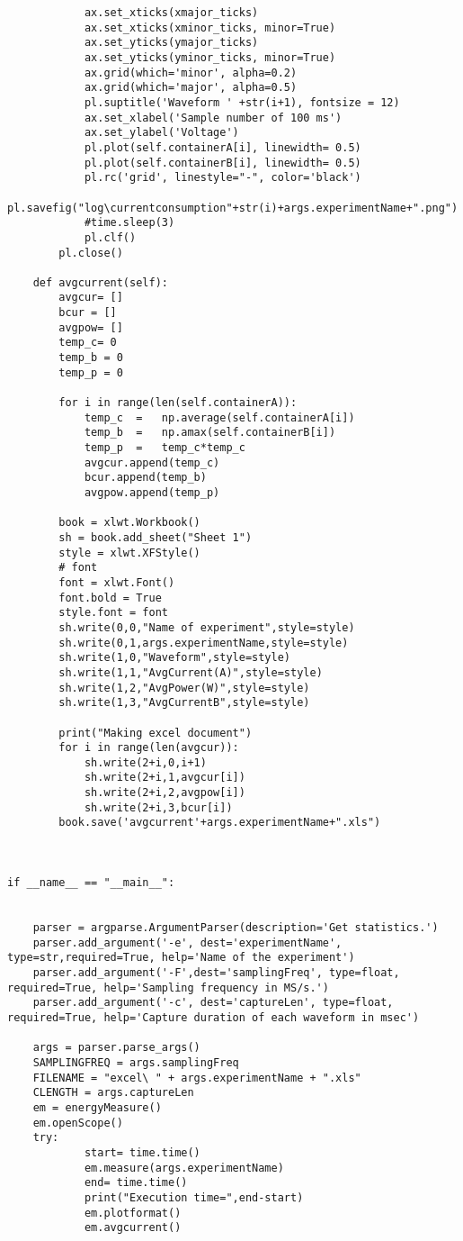 \begin{appendices}
\begin{lstlisting}
			ax.set_xticks(xmajor_ticks)                                                       
			ax.set_xticks(xminor_ticks, minor=True)                                           
			ax.set_yticks(ymajor_ticks)                                                       
			ax.set_yticks(yminor_ticks, minor=True)
			ax.grid(which='minor', alpha=0.2)                                                
			ax.grid(which='major', alpha=0.5)   
			pl.suptitle('Waveform ' +str(i+1), fontsize = 12)
			ax.set_xlabel('Sample number of 100 ms')
			ax.set_ylabel('Voltage')
			pl.plot(self.containerA[i], linewidth= 0.5)
			pl.plot(self.containerB[i], linewidth= 0.5)
			pl.rc('grid', linestyle="-", color='black')
			pl.savefig("log\currentconsumption"+str(i)+args.experimentName+".png")
			#time.sleep(3)
			pl.clf()
		pl.close()
                                                 
	def avgcurrent(self):
		avgcur= []
		bcur = []
		avgpow= []
		temp_c= 0
		temp_b = 0
		temp_p = 0
		
		for i in range(len(self.containerA)):
			temp_c	=	np.average(self.containerA[i])
			temp_b	=	np.amax(self.containerB[i])
			temp_p	=	temp_c*temp_c
			avgcur.append(temp_c)
			bcur.append(temp_b)
			avgpow.append(temp_p)
		
		book = xlwt.Workbook()
		sh = book.add_sheet("Sheet 1")
		style = xlwt.XFStyle()
		# font
		font = xlwt.Font()
		font.bold = True
		style.font = font
		sh.write(0,0,"Name of experiment",style=style)
		sh.write(0,1,args.experimentName,style=style)
		sh.write(1,0,"Waveform",style=style)
		sh.write(1,1,"AvgCurrent(A)",style=style)
		sh.write(1,2,"AvgPower(W)",style=style)
		sh.write(1,3,"AvgCurrentB",style=style)
		
		print("Making excel document")
		for i in range(len(avgcur)):
			sh.write(2+i,0,i+1)
			sh.write(2+i,1,avgcur[i])
			sh.write(2+i,2,avgpow[i])
			sh.write(2+i,3,bcur[i])
		book.save('avgcurrent'+args.experimentName+".xls")



if __name__ == "__main__":


	parser = argparse.ArgumentParser(description='Get statistics.')
	parser.add_argument('-e', dest='experimentName', type=str,required=True, help='Name of the experiment')
	parser.add_argument('-F',dest='samplingFreq', type=float, required=True, help='Sampling frequency in MS/s.')
	parser.add_argument('-c', dest='captureLen', type=float, required=True, help='Capture duration of each waveform in msec')

	args = parser.parse_args()
	SAMPLINGFREQ = args.samplingFreq
	FILENAME = "excel\ " + args.experimentName + ".xls"
	CLENGTH = args.captureLen
	em = energyMeasure()
	em.openScope()
	try:
			start= time.time()
			em.measure(args.experimentName)
			end= time.time()
			print("Execution time=",end-start)
			em.plotformat()
			em.avgcurrent()
		

\end{lstlisting}
\end{appendices}
